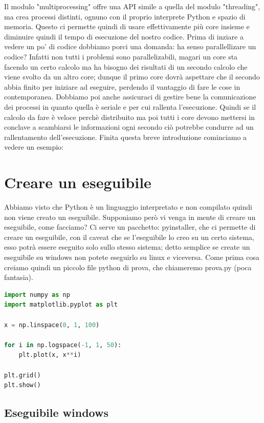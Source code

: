 \documentclass[10pt,a4paper]{article}
\begin{document}
Il modulo "multiprocessing" offre una API simile a quella del modulo "threading", ma crea processi distinti, ognuno con il proprio interprete Python e spazio di memoria. Questo ci permette quindi di usare effettivamente più core insieme e diminuire quindi il tempo di esecuzione del nostro codice. Prima di inziare a vedere un po' di codice dobbiamo porci una domanda: ha senso parallellizare un codice? Infatti non tutti i problemi sono parallelizabili, magari un core sta facendo un certo calcolo ma ha bisogno dei risultati di un secondo calcolo che viene svolto da un altro core; dunque il primo core dovrà aspettare che il secondo abbia finito per iniziare ad eseguire, perdendo il vantaggio di fare le cose in contemporanea. Dobbiamo poi anche assicuraci di gestire bene la comunicazione dei processi in quanto quella è seriale e per cui rallenta l'esecuzione. Quindi se il calcolo da fare è veloce perchè distribuito ma poi tutti i core devono mettersi in conclave a scambiarsi le informazioni ogni secondo ciò potrebbe condurre ad un rallentamento dell'esecuzione. Finita questa breve introduzione cominciamo a vedere un esempio:

\newpage


\section{Creare un eseguibile}

Abbiamo visto che Python è un linguaggio interpretato e non compilato quindi non viene creato un eseguibile. Supponiamo però vi venga in mente di creare un eseguibile, come facciamo?
Ci serve un pacchetto: pyinstaller, che ci permette di creare un eseguibile, con il caveat che se l'eseguibile lo creo su un certo sistema, esso potrà essere eseguito solo sullo stesso sistema; detto semplice se create un eseguibile su windows non potete eseguirlo su linux e viceversa. Come prima cosa creiamo quindi un piccolo file python di prova, che chiameremo prova.py (poca fantasia).

\begin{lstlisting}[language=Python]
import numpy as np
import matplotlib.pyplot as plt

x = np.linspace(0, 1, 100)

for i in np.logspace(-1, 1, 50):
    plt.plot(x, x**i)

plt.grid()
plt.show()
\end{lstlisting}

\subsection{Eseguibile windows}
\end{document}
